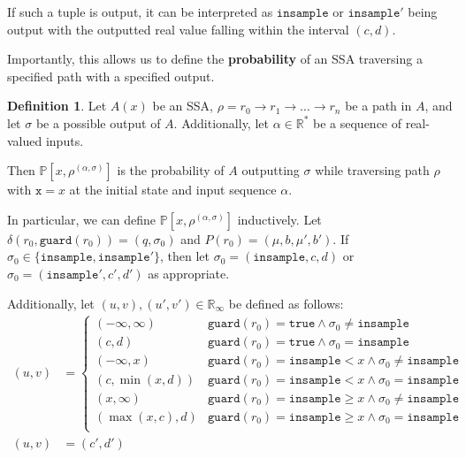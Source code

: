 \documentclass[12pt]{article}
\newcommand{\RR}{\mathbb{R}}
\newcommand{\PP}{\mathbb{P}}
\newcommand{\gguard}[1][x]{\texttt{insample}\geq #1}
\newcommand{\lguard}[1][x]{\texttt{insample} < #1}
\newcommand{\guard}{\texttt{guard}}
\theoremstyle{definition}
\newtheorem{defn}[thm]{Definition}
\begin{document}
If such a tuple is output, it can be interpreted as $\texttt{insample}$ or $\texttt{insample}'$ being output with the outputted real value falling within the interval $(c, d)$. 

Importantly, this allows us to define the \textbf{probability} of an SSA traversing a specified path with a specified output. 

\begin{defn}
    Let $A(x)$ be an SSA, $\rho = r_0\to r_1\to \ldots \to r_n$ be a path in $A$, and let $\sigma$ be a possible output of $A$. Additionally, let $\alpha \in \RR^*$ be a sequence of real-valued inputs. 

    Then $\PP[x, \rho^{(\alpha, \sigma)}]$ is the probability of $A$ outputting $\sigma$ while traversing path $\rho$ with $\texttt{x} = x$ at the initial state and input sequence $\alpha$.
    
    In particular, we can define $\PP[x, \rho^{(\alpha, \sigma)}]$ inductively. Let $\delta(r_0, \guard(r_0))=(q, \sigma_0)$ and $P(r_0) = (\mu, b, \mu', b')$. If $\sigma_0 \in \{\texttt{insample}, \texttt{insample}'\}$, then let $\sigma_0 = (\texttt{insample}, c, d)$ or $\sigma_0 = (\texttt{insample}', c', d')$ as appropriate. 

    Additionally, let $(u, v), (u', v')\in \RR_{\infty}$ be defined as follows:
    \begin{align*}
        (u, v) &= \begin{cases}
        (-\infty, \infty) & \guard(r_0)=\texttt{true}\land \sigma_0 \neq \texttt{insample}\\
        (c, d) &\guard(r_0)=\texttt{true}\land \sigma_0 = \texttt{insample}\\
        (-\infty, x) & \guard(r_0)=\lguard\land \sigma_0 \neq \texttt{insample}\\
        (c, \min(x, d)) &\guard(r_0)=\lguard\land \sigma_0 = \texttt{insample}\\
        (x, \infty) & \guard(r_0)=\gguard\land \sigma_0 \neq \texttt{insample}\\
        (\max(x, c), d) &\guard(r_0)=\gguard\land \sigma_0 = \texttt{insample}\\
    \end{cases}\\
    (u, v)& = (c', d')\end{align*}
    

\end{defn}
\end{document}
